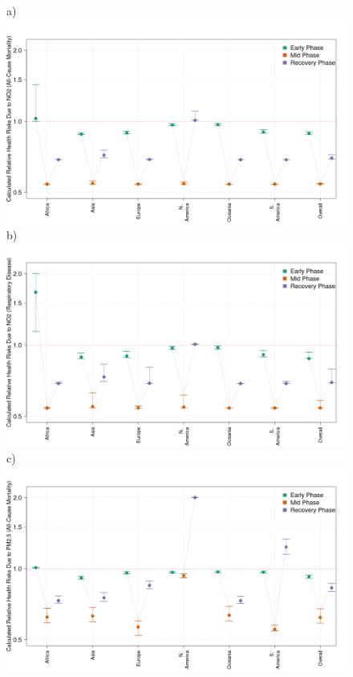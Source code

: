 \documentclass[preprint,10pt]{elsarticle} %
\begin{document}
\begin{figure}
\centering
\scriptsize{a})\includegraphics[trim={0 0 25 23},clip,scale=0.23]{Images/no2risks.png}
\scriptsize{b})\includegraphics[trim={0 0 25 23},clip,scale=0.23]{Images/no2respiratoryrisks.png}
\\
\scriptsize{c)}\includegraphics[trim={0 0 25 23},clip,scale=0.23]{Images/pm25risks.png}

\end{figure}
\end{document}
